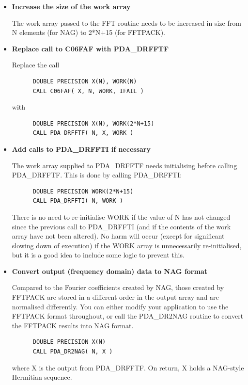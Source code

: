 \documentclass[11pt,twoside]{article}
\newcommand{\htmlref}[2]{#1}
\begin{document}
\begin{itemize}

\item{\bf Increase the size of the work array}

   The work array passed to the FFT routine needs to be increased in
   size from N elements (for NAG) to 2*N+15 (for FFTPACK).

\item{\bf Replace call to C06FAF with
\htmlref{PDA\_DRFFTF}{PDA\_RFFTF}}

   Replace the call

\begin{verbatim}
      DOUBLE PRECISION X(N), WORK(N)
      CALL C06FAF( X, N, WORK, IFAIL )
\end{verbatim}

   with

\begin{verbatim}
      DOUBLE PRECISION X(N), WORK(2*N+15)
      CALL PDA_DRFFTF( N, X, WORK )
\end{verbatim}

\item{\bf\label{faf3}Add calls to
\htmlref{PDA\_DRFFTI}{PDA\_RFFTI}
if necessary}

   The work array supplied to PDA\_DRFFTF needs initialising before calling
   PDA\_DRFFTF. This is done by calling PDA\_DRFFTI:

\begin{verbatim}
      DOUBLE PRECISION WORK(2*N+15)
      CALL PDA_DRFFTI( N, WORK )
\end{verbatim}

   There is no need to re-initialise WORK if the value of N has not
   changed since the previous call to PDA\_DRFFTI (and if the contents of the
   work array have not been altered). No harm will occur (except for
   significant slowing down of execution) if the WORK array is
   unnecessarily re-initialised, but it is a good idea to include some
   logic to prevent this.

\item{\bf Convert output (frequency domain) data to NAG format}

   Compared to the Fourier coefficients created by NAG, those created
   by FFTPACK are stored in a different order in the output array and
   are normalised differently. You can either modify your application to
   use the FFTPACK format throughout, or call
   the
\htmlref{PDA\_DR2NAG}{PDA\_R2NAG}
   routine to convert the FFTPACK results into NAG format.

\begin{verbatim}
      DOUBLE PRECISION X(N)
      CALL PDA_DR2NAG( N, X )
\end{verbatim}

   where X is the output from PDA\_DRFFTF. On return, X holds a NAG-style
   Hermitian sequence.

\end{itemize}
\end{document}
